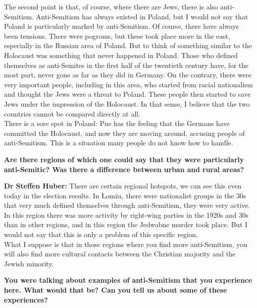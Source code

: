 The second point is that, of course, where there are Jews, there is also anti-Semitism. Anti-Semitism has always existed in Poland, but I would not say that Poland is particularly marked by anti-Semitism. Of course, there have always been tensions. There were pogroms, but these took place more in the east, especially in the Russian area of Poland. But to think of something similar to the Holocaust was something that never happened in Poland. Those who defined themselves as anti-Semites in the first half of the twentieth century have, for the most part, never gone as far as they did in Germany. On the contrary, there were very important people, including in this area, who started from racial nationalism and thought the Jews were a threat to Poland. These people then started to save Jews under the impression of the Holocaust. In that sense, I believe that the two countries cannot be compared directly at all.\\
There is a sore spot in Poland: Pne has the feeling that the Germans have committed the Holocaust, and now they are moving around, accusing people of anti-Semitism. This is a situation many people do not know how to handle. 

\textbf{Are there regions of which one could say that they were particularly anti-Semitic? Was there a difference between urban and rural areas?} 

\textbf{Dr Steffen Huber:} There are certain regional hotspots, we can see this even today in the election results. In Łomża, there were nationalist groups in the 30s that very much defined themselves through anti-Semitism, they were very active. In this region there was more activity by right-wing parties in the 1920s and 30s than in other regions, and in this region the Jedwabne murder took place. But I would not say that this is only a problem of this specific region.\\
What I suppose is that in those regions where you find more anti-Semitism, you will also find more cultural contacts between the Christian majority and the Jewish minority. 

\textbf{You were talking about examples of anti-Semitism that you experience here. What would that be? Can you tell us about some of these experiences?} 

